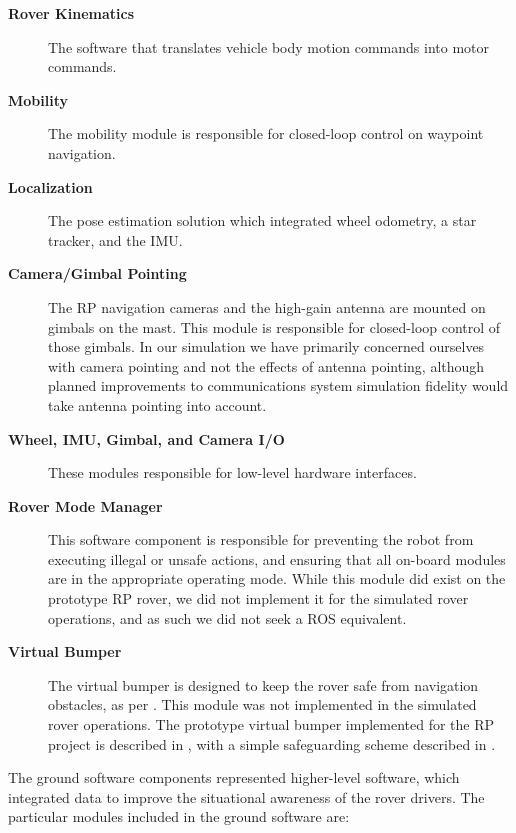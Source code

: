 \documentclass[twocolumn,letterpaper]{IEEEAerospaceCLS}  %
\begin{document}
\begin{description}
\item[\textbf{Rover Kinematics}] The software that translates vehicle body motion commands into motor commands.
\item[\textbf{Mobility}] The mobility module is responsible for closed-loop control on waypoint navigation.
\item[\textbf{Localization}]  The pose estimation solution which integrated wheel odometry, a star tracker, and the IMU.  
\item[\textbf{Camera/Gimbal Pointing}] The RP navigation cameras and the high-gain antenna are mounted on gimbals on the mast.
This module is responsible for closed-loop control of those gimbals.  
In our simulation we have primarily concerned ourselves with camera pointing and not the effects of antenna pointing, although planned improvements to communications system simulation fidelity would take antenna pointing into account.  
\item[\textbf{Wheel, IMU, Gimbal, and Camera I/O}]  These modules responsible for low-level hardware interfaces.  
\item[\textbf{Rover Mode Manager}] This software component is responsible for preventing the robot from executing illegal or unsafe actions, and ensuring that all on-board modules are in the appropriate operating mode.  
While this module did exist on the prototype RP rover, we did not implement it for the simulated rover operations, and as such we did not seek a ROS equivalent.
\item[\textbf{Virtual Bumper}]  The virtual bumper is designed to keep the rover safe from navigation obstacles, as per \cite{matthies1997fast}. 
This module was not implemented in the simulated rover operations. 
The prototype virtual bumper implemented for the RP project is described in \cite{nefian2017structured}, with a simple safeguarding scheme described in \cite{furlong2016safeguarding}.
\end{description}


The ground software components represented higher-level software, which integrated data to improve the situational awareness of the rover drivers.  
The particular modules included in the ground software are:
\end{document}
